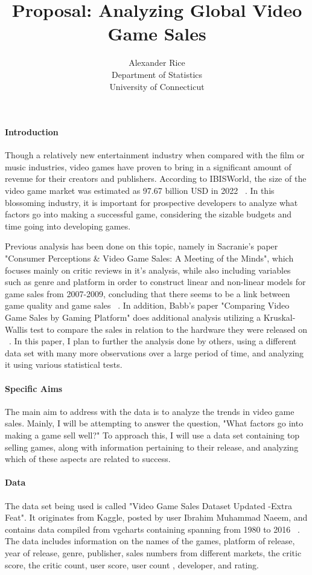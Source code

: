 \documentclass[12pt]{article}
\title{Proposal: Analyzing Global Video Game Sales}
\author{Alexander Rice\\
  Department of Statistics\\
  University of Connecticut
}
\begin{document}
\maketitle


\paragraph{Introduction}
Though a relatively new entertainment industry when compared with the film or music industries, video games have proven to bring in a 
significant amount of revenue for their creators and publishers. According to IBISWorld, the size of the video game market was estimated
 as 97.67 billion USD in 2022 ~\citep[(A)][]{Marketsizestat}.  In this blossoming industry, it is important for prospective developers 
 to analyze what factors go into making a successful game, considering the sizable budgets and time going into developing games. 

Previous analysis has been done on this topic, namely in Sacranie's paper "Consumer Perceptions \& Video Game Sales: A Meeting of the Minds", 
which focuses mainly on critic reviews in it's analysis, while also including variables such as genre and platform in order to construct 
linear and non-linear models for game sales from 2007-2009, concluding that there seems to be a link between game quality and game sales 
~\citep[(B)][]{Sacranie2010Analysis}. In addition, Babb's paper "Comparing Video Game Sales by Gaming Platform" does additional analysis 
utilizing a Kruskal-Wallis test to compare the sales in relation to the hardware they were released on ~\citep[(C)][]{Babb2013Analysis}. 
In this paper, I plan to further the analysis done by others, using a different data set with many more observations over a large period 
of time, and analyzing it using various statistical tests.


\paragraph{Specific Aims}
The main aim to address with the data is to analyze the trends in video game sales. Mainly, I will be attempting to answer the question,
 "What factors go into making a game sell well?" To approach this, I will use a data set containing top selling games, along with 
 information pertaining to their release, and analyzing which of these aspects are related to success.

\paragraph{Data}
The data set being used is called "Video Game Sales Dataset Updated -Extra Feat". It originates from Kaggle, posted by user 
Ibrahim Muhammad Naeem, and contains data compiled from vgcharts containing spanning from 1980 to 2016 ~\citep[(D)][]{maindataset}. 
The data includes information on the names of the games, platform of release, year of  release, genre, publisher, sales numbers 
from different markets, the critic score, the critic count, user score, user count , developer, and rating.
\end{document}

